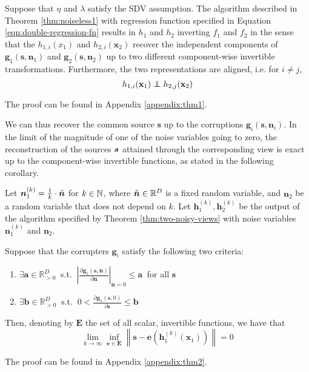 \medskip

\begin{theorem}\label{thm:two-noisy-views}
	Suppose that ${\eta}$ and ${\lambda}$ satisfy the SDV assumption.
	The algorithm described in Theorem \ref{thm:noiseless1} with regression function specified in Equation \ref{eqn:double-regression-fn} results in ${h}_1$ and ${h}_2$ inverting ${f}_1$ and ${f}_2$ in the sense that the $h_{1,i}({x}_1)$ and $h_{2,i}(\bm{x}_2)$ recover the independent components of $\bm{g}_1(\bm{s}, \bm{n}_1)$ and $\bm{g}_2(\bm{s}, \bm{n}_2)$ up to two different component-wise invertible transformations. Furthermore, the two representations are aligned, i.e. for $i\not=j$,
	\begin{equation*}
	h_{1,i}(\mathbf{x}_{1})\independent h_{2,j}(\mathbf{x}_{2})
	\end{equation*}
\end{theorem}
The proof can be found in Appendix \ref{appendix:thm1}.




We can thus recover the common source $\bm{s}$ up to the corruptions $\bm{g}_i(\bm{s}, \bm{n}_i)$.
In the limit of the magnitude of one of the noise variables going to zero, the reconstruction of the sources ${\bm{s}}$ attained through the corresponding view is exact up to the component-wise invertible functions, as stated in the following corollary.

\medskip

\begin{corollary}
	\label{crl:lownoise}
	Let $\bm{n}_1^{(k)} = \frac{1}{k} \cdot  \Tilde{\bm{n}}$ for $k \in \mathbb{N}$, where $\Tilde{\bm{n}}\in\mathbb{R}^D$ is a fixed random variable, and $\bm{n}_2$ be a random variable that does not depend on $k$.
	Let $\bm{h}_1^{(k)}, \bm{h}_2^{(k)}$ be the output of the algorithm specified by Theorem \ref{thm:two-noisy-views} with noise variables $\bm{n}_1^{(k)}$ and $\bm{n}_2$.
	
	Suppose that the corrupters $\bm{g}_i$ satisfy the following two criteria:
	\begin{enumerate}
		\item $\exists \bm{a}  \in \mathbb{R}_{> 0}^D \: $   s.t. $\: \left|\frac{\partial \bm{g}_1(\bm{s},\bm{n})}{\partial \bm{n}} \right|_{\bm{n}=0} \leq \bm{a} \: $ for all $\bm{s}$
		\item $\exists \bm{b}  \in \mathbb{R}_{> 0}^D \: $ s.t. $\: 0<\frac{\partial \bm{g}_1(\bm{s},0)}{\partial \bm{s}} \leq \bm{b}$
	\end{enumerate}
	Then, denoting by $\bm{E}$ the set of all scalar, invertible functions, we have that
	\[
	\lim_{k \to \infty} \inf_{\bm{e}\in \bm{E}} \left \|\bm{s} - \bm{e}(\bm{h}_1^{(k)}(\bm{x}_1)) \right \| = 0
	\]
\end{corollary}
The proof can be found in Appendix \ref{appendix:thm2}.

